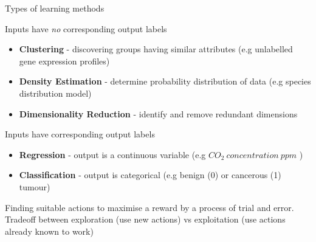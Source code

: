 \documentclass[pdf]{beamer}
\begin{document}
\begin{frame}{Types of learning methods}
\small
\begin{description}
	\item<2->[Unsupervised learning:] Inputs have \textit{no} corresponding output labels
		\begin{itemize}
			\item \textbf{Clustering} - discovering groups having similar attributes (e.g unlabelled gene expression profiles)
			\item \textbf{Density Estimation} - determine probability distribution of data (e.g species distribution model)
			\item \textbf{Dimensionality Reduction} - identify and remove redundant dimensions 
		\end{itemize}
	\item<3->[Supervised learning:] Inputs have corresponding output labels
		\begin{itemize}
			\item \textbf{Regression} - output is a continuous variable (e.g $CO_2\ concentration\ ppm$ )
			\item \textbf{Classification} - output is categorical (e.g benign (0) or cancerous (1) tumour)
		\end{itemize}	
	\item<4->[Reinforcement learning:] Finding suitable actions to maximise a reward by a
	process of trial and error. Tradeoff between exploration (use new actions) vs exploitation
	(use actions already known to work) 
\end{description}
\end{frame}
\normalsize
\end{document}
